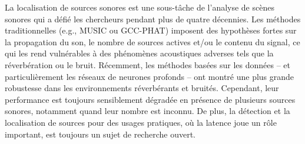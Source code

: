 \begin{resume}

La localisation de sources sonores est une sous-tâche de l'analyse de scènes sonores qui a défié les chercheurs pendant plus de quatre décennies. Les méthodes traditionnelles (e.g., MUSIC ou GCC-PHAT) imposent des hypothèses fortes sur la propagation du son, le nombre de sources actives et/ou le contenu du signal, ce qui les rend vulnérables à des phénomènes acoustiques adverses tels que la réverbération ou le bruit. Récemment, les méthodes basées sur les données -- et particulièrement les réseaux de neurones profonds – ont montré une plus grande robustesse dans les environnements réverbérants et bruités. Cependant, leur performance est toujours sensiblement dégradée en présence de plusieurs sources sonores, notamment quand leur nombre est inconnu. De plus, la détection et la localisation de sources pour des usages pratiques, où la latence joue un rôle important, est toujours un sujet de recherche ouvert.


\end{resume}
